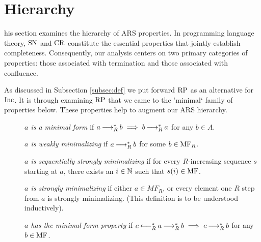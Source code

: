 \section{Hierarchy}
\label{sec:Hierarchy}

\newenvironment{counterexample}[1][]{%
    \refstepcounter{CEcounter} %
    \noindent \scriptsize\textbf{{\theCEcounter } }  #1\par
}

This section examines the hierarchy of ARS properties. 
In programming language theory, $\mathrm{SN}$ and $\mathrm{CR}$ constitute the essential properties that 
jointly establish completeness. 
Consequently, our analysis centers on two primary categories of properties: those associated 
with termination and those associated with confluence.

As discussed in Subsection \ref{subsec:def} we put forward $\mathrm{RP}$ as an alternative for $\mathrm{Inc}$. It is through examining $\mathrm{RP}$ that 
we came to the 'minimal` family of properties below. These properties help to augment our ARS hierarchy. 

\begin{definition}\label{def:mf} \hfill
    \begin{description}
        \item[] \emph{$a$ is a minimal form} if $a \mathbin{\longrightarrow_R^*} b \implies b \mathbin{\longrightarrow_R^*} a$ for any $b \in A$.
        \item[] \emph{$a$ is weakly minimalizing} if $a \mathbin{\longrightarrow_R^*} b$ for some $b \in \mathrm{MF}_R$.
        \item[] \emph{$a$ is sequentially strongly minimalizing} if for every $R$-increasing sequence $s$ starting at $a$, there exists 
        an $i \in \mathbb{N}$ such that $s (i) \in \mathrm{MF}$. 
        \item[]  \emph{$a$ is strongly minimalizing} if either $a \in MF_R$, or every element one $R$ step from $a$ is strongly minimalizing. (This 
        definition is to be understood inductively).
        \item[] \emph{$a$ has the minimal form property} if $c \mathbin{\longleftarrow_R^*} a \mathbin{\longrightarrow_R^*} b \implies c \mathbin{\longrightarrow_R^*} b$ for any $b \in \mathrm{MF}$.

    \end{description} 
\end{definition}

